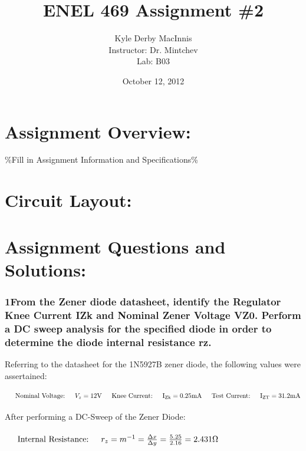 \documentclass[letterpaper,12pt]{article}
\title{\bf{ENEL 469 Assignment \#2}}
\author{Kyle Derby MacInnis \\ Instructor: Dr. Mintchev \\ Lab: B03}
\date{ October 12, 2012 }
\begin{document}
\maketitle

\pagebreak

\section*{Assignment Overview:}
\%Fill in Assignment Information and Specifications\%

\section*{Circuit Layout:}


\pagebreak

\section*{Assignment Questions and Solutions:}

\subsubsection*{\bf{1\indent From the Zener diode datasheet, identify the Regulator Knee Current IZk and Nominal Zener Voltage VZ0. Perform a DC sweep analysis for the specified diode in order to determine the diode internal resistance rz.
}}
{
Referring to the datasheet\cite{zener_ds} for the 1N5927B zener diode, the following values were assertained: \\ \\
\begin{math}
\indent \textrm{Nominal Voltage:} \indent V_z = 12\rm{V} \\ \\
\indent \textrm{Knee Current:} \indent I_{Zk} = 0.25\rm{mA} \\ \\
\indent \textrm{Test Current:} \indent I_{ZT} = 31.2\rm{mA}
\end{math}
\\ \\
After performing a DC-Sweep of the Zener Diode:
\\ \\
\begin{math}
\indent \textrm{Internal Resistance:} \indent r_z = m^{-1} = \frac{\Delta x}{\Delta y} = \frac{5.25}{2.16} = 2.431\Omega
\end{math}
}
\end{document}
